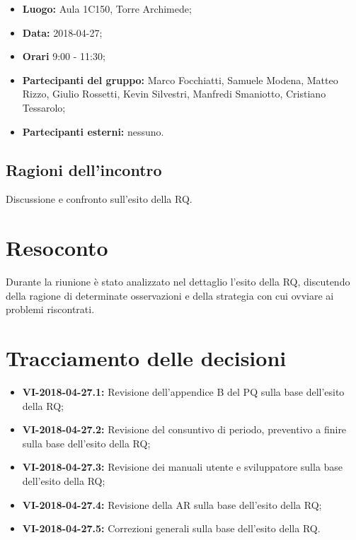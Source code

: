 \documentclass[openany,12pt,a4paper]{article}
\begin{document}
	\begin{itemize} 
	    \item \textbf{Luogo:} Aula 1C150, Torre Archimede;
	    \item \textbf{Data:} 2018-04-27;
	    \item \textbf{Orari} 9:00 - 11:30;
	    \item \textbf{Partecipanti del gruppo:} Marco Focchiatti, Samuele Modena, Matteo Rizzo, Giulio Rossetti, Kevin Silvestri, Manfredi Smaniotto, Cristiano Tessarolo;
	    \item \textbf{Partecipanti esterni:} nessuno.
	\end{itemize}
	
	\subsection{Ragioni dell'incontro}
	
	Discussione e confronto sull'esito della RQ.

	\section{Resoconto}
	
	Durante la riunione è stato analizzato nel dettaglio l'esito della RQ, discutendo della ragione di determinate osservazioni e della strategia con cui ovviare ai problemi riscontrati.  
	
	\section{Tracciamento delle decisioni}
	
	\begin{itemize}
	    \item \textbf{VI-2018-04-27.1:} Revisione dell'appendice B del PQ sulla base dell'esito della RQ;
	    \item \textbf{VI-2018-04-27.2:} Revisione del consuntivo di periodo, preventivo a finire sulla base dell'esito della RQ;
	    \item \textbf{VI-2018-04-27.3:} Revisione dei manuali utente e sviluppatore sulla base dell'esito della RQ;
	    \item \textbf{VI-2018-04-27.4:} Revisione della AR sulla base dell'esito della RQ;
	    \item \textbf{VI-2018-04-27.5:} Correzioni generali sulla base dell'esito della RQ.
	\end{itemize}	

	
\end{document}
